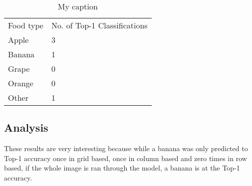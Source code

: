 \begin{table}[]
	\centering
	\caption{My caption}
	\label{my-label}
	\begin{tabular}{ll}
		Food type & No. of Top-1 Classifications \\
		Apple     & 3                      \\
		Banana    & 1                      \\
		Grape     & 0                      \\
		Orange    & 0                      \\
		Other     & 1                     
	\end{tabular}
\end{table}
\tocless\subsection{Analysis}
These results are very interesting because while a banana was only predicted to
Top-1 accuracy once in grid based, once in column based and zero times in row
based, if the whole image is ran through the model, a banana is at the Top-1 accuracy.
























